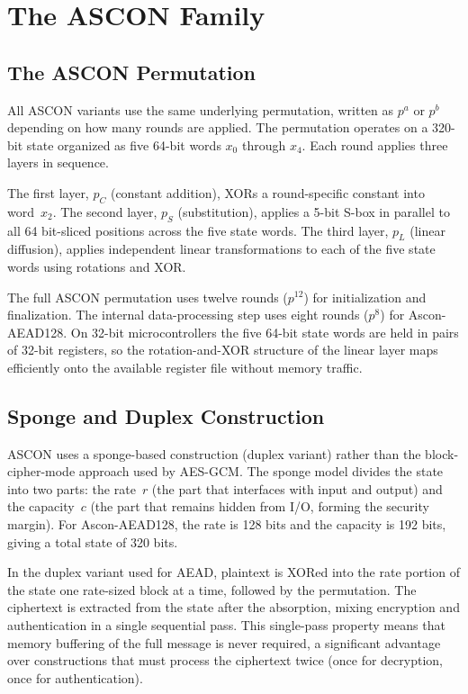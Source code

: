\section{The ASCON Family}

\subsection{The ASCON Permutation}

All ASCON variants use the same underlying permutation, written as $p^a$ or
$p^b$ depending on how many rounds are applied.
The permutation operates on a 320-bit state organized as five 64-bit words
$x_0$ through $x_4$.
Each round applies three layers in sequence.

The first layer, $p_C$ (constant addition), XORs a round-specific constant into
word~$x_2$.
The second layer, $p_S$ (substitution), applies a 5-bit S-box in parallel to
all 64 bit-sliced positions across the five state words.
The third layer, $p_L$ (linear diffusion), applies independent linear
transformations to each of the five state words using rotations and XOR.

The full ASCON permutation uses twelve rounds ($p^{12}$) for initialization and
finalization.
The internal data-processing step uses eight rounds ($p^8$) for Ascon-AEAD128.
On 32-bit microcontrollers the five 64-bit state words are held in pairs of
32-bit registers, so the rotation-and-XOR structure of the linear layer maps
efficiently onto the available register file without memory traffic.

\subsection{Sponge and Duplex Construction}

ASCON uses a sponge-based construction (duplex variant)
rather than the block-cipher-mode approach used by AES-GCM.
The sponge model divides the state into two parts: the rate~$r$ (the part that
interfaces with input and output) and the capacity~$c$ (the part that remains
hidden from I/O, forming the security margin).
For Ascon-AEAD128, the rate is 128 bits and the capacity is 192 bits, giving a
total state of 320 bits.

In the duplex variant used for AEAD, plaintext is XORed into the rate portion of
the state one rate-sized block at a time, followed by the permutation.
The ciphertext is extracted from the state after the absorption, mixing
encryption and authentication in a single sequential pass.
This single-pass property means that memory buffering of the full message is
never required, a significant advantage over constructions that must process the
ciphertext twice (once for decryption, once for authentication).

